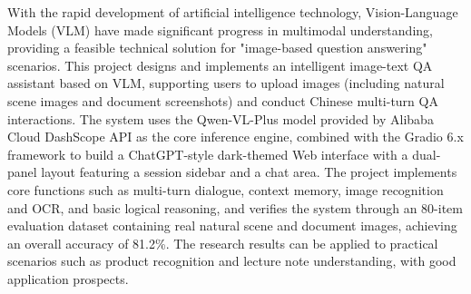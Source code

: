 

\begin{abstract}
  随着人工智能技术的快速发展，视觉语言模型（Vision-Language Model, VLM）在多模态理解领域取得了显著进展，为"看图问答"场景提供了可行的技术方案。本项目设计并实现了一个基于VLM的智能图文问答助手，支持用户上传图片（包括自然场景图像和文档截图）并进行中文多轮问答交互。系统采用阿里云DashScope API提供的Qwen-VL-Plus模型作为核心推理引擎，结合Gradio 6.x框架构建了ChatGPT风格的暗色主题Web交互界面，支持左侧会话列表管理与右侧聊天区域的双栏布局。项目实现了多轮对话、上下文记忆、图片识别与OCR、基础逻辑推理等核心功能，并通过构建包含真实自然场景和文档图像的80条评测数据集对系统进行了验证，整体准确率达到81.2\%。研究成果可应用于商品识别、讲义理解等实际场景，具有良好的应用前景。

\end{abstract}

\begin{abstract*}
  With the rapid development of artificial intelligence technology, Vision-Language Models (VLM) have made significant progress in multimodal understanding, providing a feasible technical solution for "image-based question answering" scenarios. This project designs and implements an intelligent image-text QA assistant based on VLM, supporting users to upload images (including natural scene images and document screenshots) and conduct Chinese multi-turn QA interactions. The system uses the Qwen-VL-Plus model provided by Alibaba Cloud DashScope API as the core inference engine, combined with the Gradio 6.x framework to build a ChatGPT-style dark-themed Web interface with a dual-panel layout featuring a session sidebar and a chat area. The project implements core functions such as multi-turn dialogue, context memory, image recognition and OCR, and basic logical reasoning, and verifies the system through an 80-item evaluation dataset containing real natural scene and document images, achieving an overall accuracy of 81.2\%. The research results can be applied to practical scenarios such as product recognition and lecture note understanding, with good application prospects.
\end{abstract*}